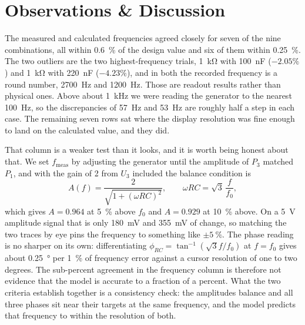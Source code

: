 \documentclass[11pt]{article}
\begin{document}
\section*{Observations \& Discussion}
The measured and calculated frequencies agreed closely for seven of the nine
combinations, all within \qty{0.6}{\percent} of the design value and six of them
within \qty{0.25}{\percent}. The two outliers are the two highest-frequency
trials, \qty{1}{\kilo\ohm} with \qty{100}{\nano\farad} ($-2.05\%$) and
\qty{1}{\kilo\ohm} with \qty{220}{\nano\farad} ($-4.23\%$), and in both the
recorded frequency is a round number, \qty{2700}{\hertz} and
\qty{1200}{\hertz}. Those are readout results rather than physical ones. Above
about \qty{1}{\kilo\hertz} we were reading the generator to the nearest
\qty{100}{\hertz}, so the discrepancies of \qty{57}{\hertz} and \qty{53}{\hertz}
are roughly half a step in each case. The remaining seven rows sat where the
display resolution was fine enough to land on the calculated value, and they did.

That column is a weaker test than it looks, and it is worth being honest about
that. We set $f_{\text{meas}}$ by adjusting the generator until the amplitude of
$P_3$ matched $P_1$, and with the gain of 2 from $U_3$ included the balance
condition is
\[
    A(f) = \frac{2}{\sqrt{1 + (\omega RC)^2}}, \qquad
    \omega RC = \sqrt{3}\,\frac{f}{f_0},
\]
which gives $A = 0.964$ at \qty{5}{\percent} above $f_0$ and $A = 0.929$ at
\qty{10}{\percent} above. On a \qty{5}{\volt} amplitude signal that is only
\qty{180}{\milli\volt} and \qty{355}{\milli\volt} of change, so matching the two
traces by eye pins the frequency to something like $\pm\qty{5}{\percent}$. The
phase reading is no sharper on its own: differentiating
$\phi_{RC} = \tan^{-1}(\sqrt{3}f/f_0)$ at $f = f_0$ gives about
\qty{0.25}{\degree} per \qty{1}{\percent} of frequency error against a cursor
resolution of one to two degrees. The sub-percent agreement in the frequency
column is therefore not evidence that the model is accurate to a fraction of a
percent. What the two criteria establish together is a consistency check: the
amplitudes balance and all three phases sit near their targets at the same
frequency, and the model predicts that frequency to within the resolution of
both.
\end{document}
